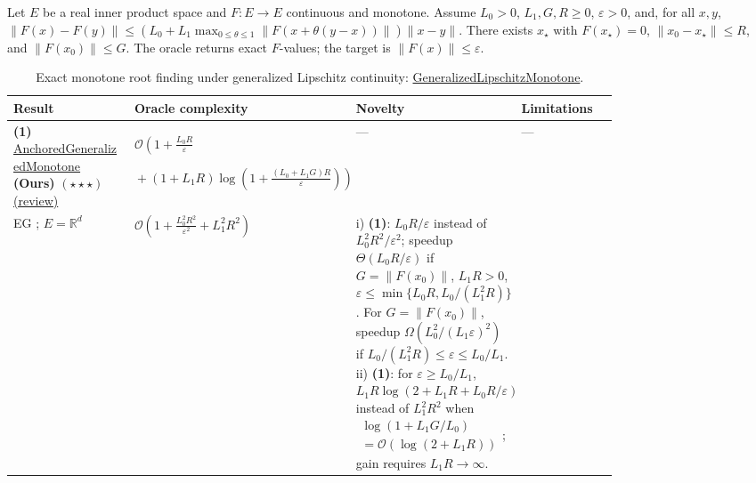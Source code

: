 \begin{table}[tp]
\centering
\caption{Exact monotone root finding under generalized Lipschitz continuity: \href{https://github.com/k3nfalt/longtails/blob/main/LongTails/Setups/GeneralizedLipschitzMonotone.lean}{Generalized\allowbreak{}Lipschitz\allowbreak{}Monotone}.}\label{tab:GeneralizedLipschitzMonotone}
\parbox{\linewidth}{\footnotesize Let $E$ be a real inner product space and $F:E\to E$ continuous and monotone. Assume $L_0>0$, $L_1,G,R\ge0$, $\varepsilon>0$, and, for all $x,y$, $\|F(x)-F(y)\|\le (L_0+L_1\max_{0\le\theta\le1}\|F(x+\theta(y-x))\|)\|x-y\|$. There exists $x_\star$ with $F(x_\star)=0$, $\|x_0-x_\star\|\le R$, and $\|F(x_0)\|\le G$. The oracle returns exact $F$-values; the target is $\|F(x)\|\le\varepsilon$.}\par\smallskip
\begin{threeparttable}
\footnotesize
\setlength{\tabcolsep}{4pt}\renewcommand{\arraystretch}{1.25}
\begin{tabularx}{\linewidth}{@{}>{\raggedright\arraybackslash}p{0.20\linewidth}>{\raggedright\arraybackslash}p{0.32\linewidth}>{\raggedright\arraybackslash}p{0.27\linewidth}>{\raggedright\arraybackslash}X@{}}
\toprule
\textbf{Result} & \textbf{Oracle complexity} & \textbf{Novelty} & \textbf{Limitations} \\
\midrule
\textbf{(1)} \href{https://github.com/k3nfalt/longtails/blob/main/LongTails/Theorems/AnchoredGeneralizedMonotone.lean}{Anchored\allowbreak{}Generalized\allowbreak{}Monotone} \textbf{(Ours)} $(\star\star\star)$ \href{https://github.com/k3nfalt/longtails/blob/main/scripts/reviews/AnchoredGeneralizedMonotone.md}{(review)}
& $\mathcal{O}\!\left(1+\frac{L_0R}{\varepsilon}\right.$\par
$\left.{}+(1+L_1R)\log\!\left(1+\frac{(L_0+L_1G)R}{\varepsilon}\right)\right)$
& ---
& --- \\
\midrule[1.2pt]
EG \citep[Thm.~3.6]{glmChoudhuryLoizou2025}; $E=\mathbb{R}^d$
& $\mathcal{O}\!\left(1+\frac{L_0^2R^2}{\varepsilon^2}+L_1^2R^2\right)$
& i) \textbf{(1)}: $L_0R/\varepsilon$ instead of $L_0^2R^2/\varepsilon^2$; speedup $\Theta(L_0R/\varepsilon)$ if $G=\|F(x_0)\|$, $L_1R>0$, $\varepsilon\le\min\{L_0R,L_0/(L_1^2R)\}$.
For $G=\|F(x_0)\|$, speedup $\Omega(L_0^2/(L_1\varepsilon)^2)$ if $L_0/(L_1^2R)\le\varepsilon\le L_0/L_1$.
\newline ii) \textbf{(1)}: for $\varepsilon\ge L_0/L_1$, $L_1R\log(2+L_1R+L_0R/\varepsilon)$ instead of $L_1^2R^2$ when $\begin{gathered}\log(1+L_1G/L_0)\\{}=\mathcal{O}\!(\log(2+L_1R))\end{gathered}$; gain requires $L_1R\to\infty$.

\end{tabularx}
\end{threeparttable}
\end{table}
